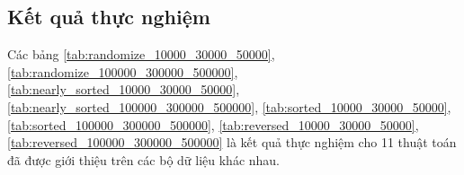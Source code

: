 \subsection{Kết quả thực nghiệm} \label{subsec:exprimental_result}
Các bảng \ref{tab:randomize_10000_30000_50000}, \ref{tab:randomize_100000_300000_500000}, \ref{tab:nearly_sorted_10000_30000_50000}, \ref{tab:nearly_sorted_100000_300000_500000}, \ref{tab:sorted_10000_30000_50000}, \ref{tab:sorted_100000_300000_500000}, \ref{tab:reversed_10000_30000_50000}, \ref{tab:reversed_100000_300000_500000} là kết quả thực nghiệm cho 11 thuật toán đã được giới thiệu trên các bộ dữ liệu khác nhau.

